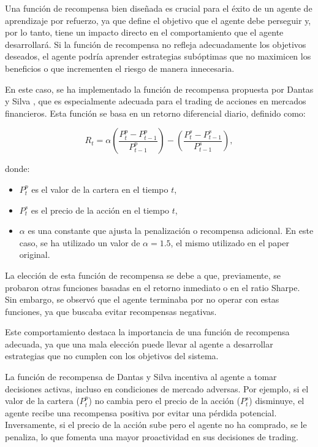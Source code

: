 \documentclass[a4paper,12pt, twoside]{report}
\begin{document}
Una función de recompensa bien diseñada es crucial para el éxito de un agente de aprendizaje por 
refuerzo, ya que define el objetivo que el agente debe perseguir y, por lo tanto, tiene un impacto 
directo en el comportamiento que el agente desarrollará. Si la función de recompensa no refleja 
adecuadamente los objetivos deseados, el agente podría aprender estrategias subóptimas que no 
maximicen los beneficios o que incrementen el riesgo de manera innecesaria.

En este caso, se ha implementado la función de recompensa propuesta por Dantas y Silva \cite{Dantas2018}, 
que es especialmente adecuada para el trading de acciones en mercados financieros. Esta función 
se basa en un retorno diferencial diario, definido como:

\begin{equation}
R_t = \alpha \left(\frac{P^p_t - P^p_{t-1}}{P^p_{t-1}}\right) - \left(\frac{P^s_t - P^s_{t-1}}{P^s_{t-1}}\right),
\end{equation}

donde:
\begin{itemize}
    \item \( P^p_t \) es el valor de la cartera en el tiempo \( t \),
    \item \( P^s_t \) es el precio de la acción en el tiempo \( t \),
    \item \( \alpha \) es una constante que ajusta la penalización o recompensa adicional. 
    En este caso, se ha utilizado un valor de \( \alpha = 1.5 \), el mismo utilizado en el paper original.
\end{itemize}

La elección de esta función de recompensa se debe a que, previamente, se probaron otras funciones 
basadas en el retorno inmediato o en el ratio Sharpe. Sin embargo, se observó que el agente terminaba 
por no operar con estas funciones, ya que buscaba evitar recompensas negativas. 

Este comportamiento destaca la importancia de una función de recompensa adecuada, ya que una mala 
elección puede llevar al agente a desarrollar estrategias que no cumplen con los objetivos del sistema.

La función de recompensa de Dantas y Silva incentiva al agente a tomar decisiones activas, incluso 
en condiciones de mercado adversas. Por ejemplo, si el valor de la cartera (\( P^p_t \)) no 
cambia pero el precio de la acción (\( P^s_t \)) disminuye, el agente recibe una recompensa positiva 
por evitar una pérdida potencial. Inversamente, si el precio de la acción sube pero el agente no 
ha comprado, se le penaliza, lo que fomenta una mayor proactividad en sus decisiones de trading.
\end{document}
